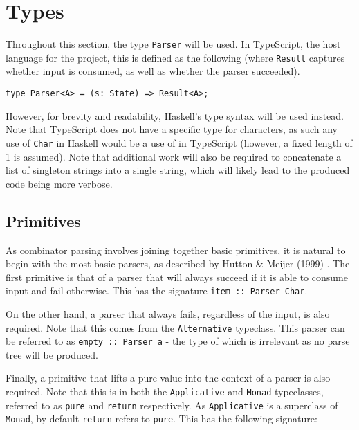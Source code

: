 \section{Types}
\label{sec:type}

Throughout this section, the type \texttt{Parser} will be used.
In TypeScript, the host language for the project, this is defined as the following (where \texttt{Result} captures whether input is consumed, as well as whether the parser succeeded).

\begin{verbatim}
type Parser<A> = (s: State) => Result<A>;
\end{verbatim}

However, for brevity and readability, Haskell's type syntax will be used instead.
Note that TypeScript does not have a specific type for characters, as such any use of \texttt{Char} in Haskell would be a use of  in TypeScript (however, a fixed length of 1 is assumed).
Note that additional work will also be required to concatenate a list of singleton strings into a single string, which will likely lead to the produced code being more verbose.

\subsection{Primitives}
\label{ssec:primitives}

As combinator parsing involves joining together basic primitives, it is natural to begin with the most basic parsers, as described by Hutton \& Meijer (1999) \cite{hutton99}.
The first primitive is that of a parser that will always succeed if it is able to consume input and fail otherwise.
This has the signature \texttt{item :: Parser Char}.

On the other hand, a parser that always fails, regardless of the input, is also required.
Note that this comes from the \texttt{Alternative} typeclass.
This parser can be referred to as \texttt{empty :: Parser a} - the type of which is irrelevant as no parse tree will be produced.

Finally, a primitive that lifts a pure value into the context of a parser is also required.
Note that this is in both the \texttt{Applicative} and \texttt{Monad} typeclasses, referred to as \texttt{pure} and \texttt{return} respectively.
As \texttt{Applicative} is a superclass of \texttt{Monad}, by default \texttt{return} refers to \texttt{pure}.
This has the following signature:


